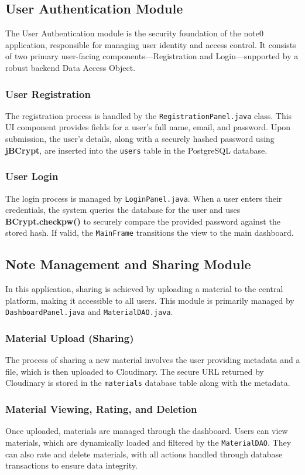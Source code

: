 \documentclass[12pt, a4paper]{report}
\begin{document}
\begin{itemize}
\subsection{User Authentication Module}
The User Authentication module is the security foundation of the note0 application, responsible for managing user identity and access control. It consists of two primary user-facing components—Registration and Login—supported by a robust backend Data Access Object.

\subsubsection{User Registration}
The registration process is handled by the \texttt{RegistrationPanel.java} class. This UI component provides fields for a user's full name, email, and password. Upon submission, the user's details, along with a securely hashed password using \textbf{jBCrypt}, are inserted into the \texttt{users} table in the PostgreSQL database.

\subsubsection{User Login}
The login process is managed by \texttt{LoginPanel.java}. When a user enters their credentials, the system queries the database for the user and uses \textbf{BCrypt.checkpw()} to securely compare the provided password against the stored hash. If valid, the \texttt{MainFrame} transitions the view to the main dashboard.

\subsection{Note Management and Sharing Module}
In this application, sharing is achieved by uploading a material to the central platform, making it accessible to all users. This module is primarily managed by \texttt{DashboardPanel.java} and \texttt{MaterialDAO.java}.

\subsubsection{Material Upload (Sharing)}
The process of sharing a new material involves the user providing metadata and a file, which is then uploaded to Cloudinary. The secure URL returned by Cloudinary is stored in the \texttt{materials} database table along with the metadata.

\subsubsection{Material Viewing, Rating, and Deletion}
Once uploaded, materials are managed through the dashboard. Users can view materials, which are dynamically loaded and filtered by the \texttt{MaterialDAO}. They can also rate and delete materials, with all actions handled through database transactions to ensure data integrity.


\end{itemize}
\end{document}
